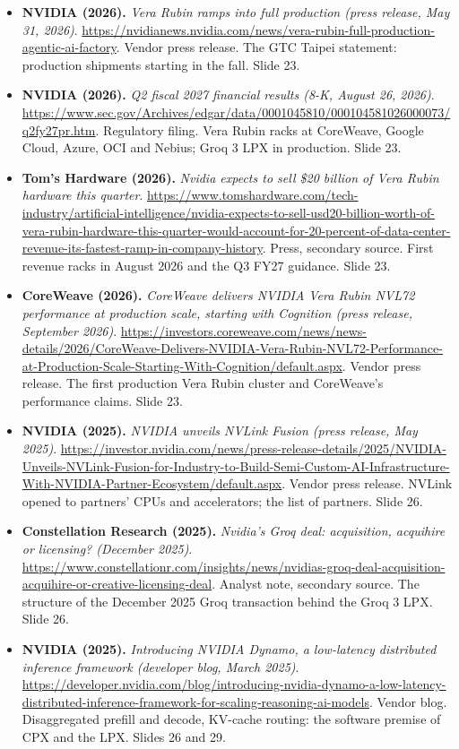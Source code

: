 \documentclass[11pt,letterpaper]{article}
\begin{document}
\begin{itemize}[leftmargin=1.2em,itemsep=3pt]
\item \textbf{NVIDIA (2026).} \textit{Vera Rubin ramps into full production (press release, May 31, 2026)}. \url{https://nvidianews.nvidia.com/news/vera-rubin-full-production-agentic-ai-factory}. Vendor press release. The GTC Taipei statement: production shipments starting in the fall. Slide 23.
\item \textbf{NVIDIA (2026).} \textit{Q2 fiscal 2027 financial results (8-K, August 26, 2026)}. \url{https://www.sec.gov/Archives/edgar/data/0001045810/000104581026000073/q2fy27pr.htm}. Regulatory filing. Vera Rubin racks at CoreWeave, Google Cloud, Azure, OCI and Nebius; Groq 3 LPX in production. Slide 23.
\item \textbf{Tom's Hardware (2026).} \textit{Nvidia expects to sell \$20 billion of Vera Rubin hardware this quarter}. \url{https://www.tomshardware.com/tech-industry/artificial-intelligence/nvidia-expects-to-sell-usd20-billion-worth-of-vera-rubin-hardware-this-quarter-would-account-for-20-percent-of-data-center-revenue-its-fastest-ramp-in-company-history}. Press, secondary source. First revenue racks in August 2026 and the Q3 FY27 guidance. Slide 23.
\item \textbf{CoreWeave (2026).} \textit{CoreWeave delivers NVIDIA Vera Rubin NVL72 performance at production scale, starting with Cognition (press release, September 2026)}. \url{https://investors.coreweave.com/news/news-details/2026/CoreWeave-Delivers-NVIDIA-Vera-Rubin-NVL72-Performance-at-Production-Scale-Starting-With-Cognition/default.aspx}. Vendor press release. The first production Vera Rubin cluster and CoreWeave's performance claims. Slide 23.
\item \textbf{NVIDIA (2025).} \textit{NVIDIA unveils NVLink Fusion (press release, May 2025)}. \url{https://investor.nvidia.com/news/press-release-details/2025/NVIDIA-Unveils-NVLink-Fusion-for-Industry-to-Build-Semi-Custom-AI-Infrastructure-With-NVIDIA-Partner-Ecosystem/default.aspx}. Vendor press release. NVLink opened to partners' CPUs and accelerators; the list of partners. Slide 26.
\item \textbf{Constellation Research (2025).} \textit{Nvidia's Groq deal: acquisition, acquihire or licensing? (December 2025)}. \url{https://www.constellationr.com/insights/news/nvidias-groq-deal-acquisition-acquihire-or-creative-licensing-deal}. Analyst note, secondary source. The structure of the December 2025 Groq transaction behind the Groq 3 LPX. Slide 26.
\item \textbf{NVIDIA (2025).} \textit{Introducing NVIDIA Dynamo, a low-latency distributed inference framework (developer blog, March 2025)}. \url{https://developer.nvidia.com/blog/introducing-nvidia-dynamo-a-low-latency-distributed-inference-framework-for-scaling-reasoning-ai-models}. Vendor blog. Disaggregated prefill and decode, KV-cache routing: the software premise of CPX and the LPX. Slides 26 and 29.
\end{itemize}
\end{document}
